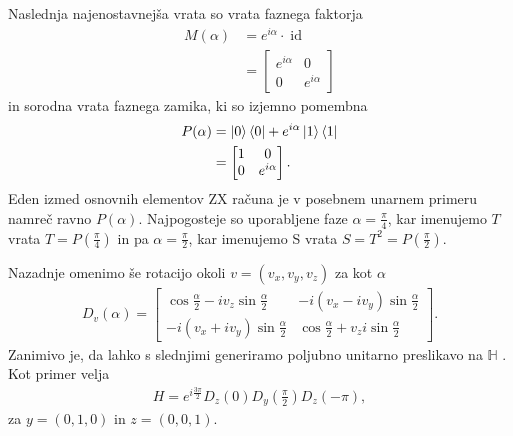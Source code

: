 \documentclass[mat1]{fmfdelo}
\newcommand{\Hb}{\mathbb H}
\DeclareMathOperator*{\id}{id}
\begin{document}
Naslednja najenostavnejša vrata so vrata faznega faktorja
\begin{align*}
    M(\alpha) &= e^{i\alpha}\cdot \id\\
              &= \begin{bmatrix}
                  e^{i\alpha}&0\\
                  0&e^{i\alpha}
              \end{bmatrix}
\end{align*}
in sorodna vrata faznega zamika, ki so izjemno pomembna
\begin{align*}
    P(\alpha) &= \ket0\bra0 + e^{i\alpha}\ket1\bra1\\
              &= \begin{bmatrix}
                  1&0\\
                  0&e^{i\alpha}
              \end{bmatrix}.
\end{align*}
Eden izmed osnovnih elementov ZX računa je v posebnem unarnem primeru namreč ravno \(P(\alpha)\). Najpogosteje so uporabljene faze \(\alpha=\frac\pi4\), kar imenujemo \(T\) vrata \(T=P(\frac\pi4)\) in pa \(\alpha=\frac\pi2\), kar imenujemo S vrata \(S = T^2=P(\frac\pi2)\).

Nazadnje omenimo še rotacijo okoli \(v=(v_x,v_y,v_z)\) za kot \(\alpha\)
\begin{align*}
    D_v(\alpha) = \begin{bmatrix}
        \cos\frac\alpha2 - iv_z\sin\frac\alpha2 & -i(v_x-iv_y)\sin\frac\alpha2\\
        -i(v_x+iv_y)\sin\frac\alpha2 & \cos\frac\alpha2 + v_zi\sin\frac\alpha2
    \end{bmatrix}.
\end{align*}
Zanimivo je, da lahko s slednjimi generiramo poljubno unitarno preslikavo na \(\Hb\) \cite[Lema 2.35]{mathforqm}. Kot primer velja 
\begin{align*}
    H = e^{i\frac{3\pi}{2}}D_z(0)D_y\left(\frac\pi2\right)D_z(-\pi),
\end{align*}
za \(y=(0,1,0)\) in \(z=(0,0,1)\).
\end{document}
